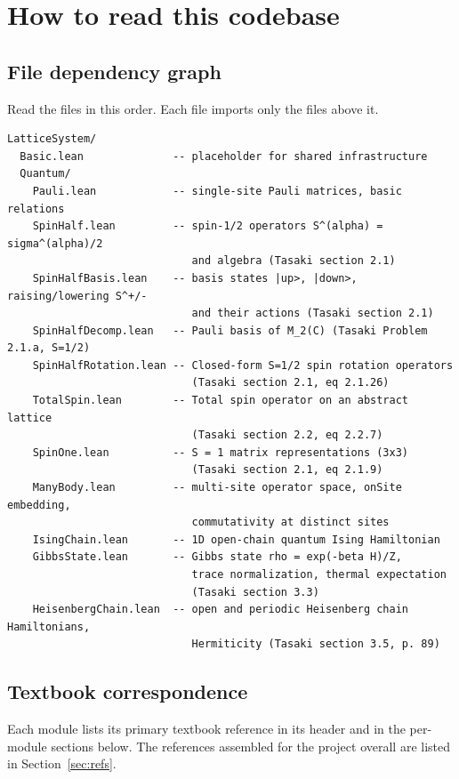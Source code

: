 \documentclass[a4paper,11pt]{article}
\begin{document}
\section{How to read this codebase}

\subsection{File dependency graph}

Read the files in this order. Each file imports only the files above it.

\begin{Verbatim}
LatticeSystem/
  Basic.lean              -- placeholder for shared infrastructure
  Quantum/
    Pauli.lean            -- single-site Pauli matrices, basic relations
    SpinHalf.lean         -- spin-1/2 operators S^(alpha) = sigma^(alpha)/2
                             and algebra (Tasaki section 2.1)
    SpinHalfBasis.lean    -- basis states |up>, |down>, raising/lowering S^+/-
                             and their actions (Tasaki section 2.1)
    SpinHalfDecomp.lean   -- Pauli basis of M_2(C) (Tasaki Problem 2.1.a, S=1/2)
    SpinHalfRotation.lean -- Closed-form S=1/2 spin rotation operators
                             (Tasaki section 2.1, eq 2.1.26)
    TotalSpin.lean        -- Total spin operator on an abstract lattice
                             (Tasaki section 2.2, eq 2.2.7)
    SpinOne.lean          -- S = 1 matrix representations (3x3)
                             (Tasaki section 2.1, eq 2.1.9)
    ManyBody.lean         -- multi-site operator space, onSite embedding,
                             commutativity at distinct sites
    IsingChain.lean       -- 1D open-chain quantum Ising Hamiltonian
    GibbsState.lean       -- Gibbs state rho = exp(-beta H)/Z,
                             trace normalization, thermal expectation
                             (Tasaki section 3.3)
    HeisenbergChain.lean  -- open and periodic Heisenberg chain Hamiltonians,
                             Hermiticity (Tasaki section 3.5, p. 89)
\end{Verbatim}

\subsection{Textbook correspondence}

Each module lists its primary textbook reference in its header and in
the per-module sections below. The references assembled for the project
overall are listed in Section~\ref{sec:refs}.
\end{document}
